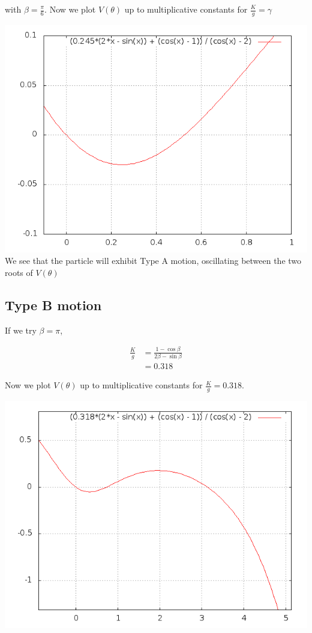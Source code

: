 \documentclass{article}
\begin{document}
with $\beta = \frac{\pi}{6}$. Now we plot $V(\theta)$ up to multiplicative constants for $\frac{K}{g} = \gamma$

\includegraphics[width=\textwidth]{4A1.png}
We see that the particle will exhibit Type A motion, oscillating between the two roots of $V(\theta)$

\subsection{Type B motion}

If we try $\beta = \pi$,

\begin{align*}
\frac{K}{g} &= \frac{1 - \cos\beta}{2\beta - \sin\beta} \\
&= 0.318
\end{align*}

Now we plot $V(\theta)$ up to multiplicative constants for $\frac{K}{g} = 0.318$. 

\includegraphics[width=\textwidth]{fail.png}
\end{document}
